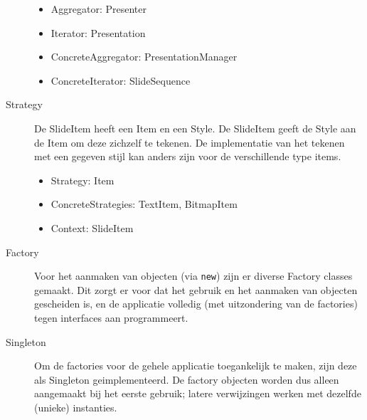 \documentclass[a4paper]{article}
\begin{document}
\begin{description}
\begin{itemize}
\item Aggregator: Presenter
\item Iterator: Presentation
\item ConcreteAggregator: PresentationManager
\item ConcreteIterator: SlideSequence
\end{itemize}

\item[Strategy] De SlideItem heeft een Item en een Style. De SlideItem geeft de Style aan de Item om deze zichzelf te tekenen. De implementatie van het tekenen met een gegeven stijl kan anders zijn voor de verschillende type items.
\begin{itemize}
\item Strategy: Item
\item ConcreteStrategies: TextItem, BitmapItem
\item Context: SlideItem
\end{itemize}

\item[Factory] Voor het aanmaken van objecten (via \texttt{new})  zijn er diverse Factory classes gemaakt. Dit zorgt er voor dat het gebruik en het aanmaken van objecten gescheiden is, en de applicatie volledig (met uitzondering van de factories) tegen interfaces aan programmeert. 

\item[Singleton] Om de factories voor de gehele applicatie toegankelijk te maken, zijn deze als Singleton geimplementeerd. De factory objecten worden dus alleen aangemaakt bij het eerste gebruik; latere verwijzingen werken met dezelfde (unieke) instanties.

\end{description}
\end{document}
